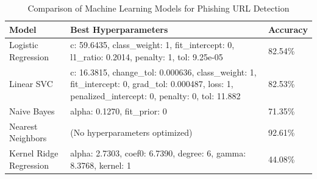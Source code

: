 \documentclass{article}
\begin{document}
    \begin{table}[H]
        \centering
        \begin{tabular}{|l|p{8cm}|l|}
            \hline
            \textbf{Model}          & \textbf{Best Hyperparameters}                                                                                                                          & \textbf{Accuracy} \\ \hline
            Logistic Regression     & c: 59.6435, class\_weight: 1, fit\_intercept: 0, l1\_ratio: 0.2014, penalty: 1, tol: 9.25e-05 & 82.54\% \\ \hline
            Linear SVC              & c: 16.3815, change\_tol: 0.000636, class\_weight: 1, fit\_intercept: 0, grad\_tol: 0.000487, loss: 1, penalized\_intercept: 0, penalty: 0, tol: 11.882 & 82.53\% \\ \hline
            Naive Bayes             & alpha: 0.1270, fit\_prior: 0                                                                                                                           & 71.35\%           \\ \hline
            Nearest Neighbors       & (No hyperparameters optimized)                                                                                                                         & 92.61\%           \\ \hline %
            Kernel Ridge Regression & alpha: 2.7303, coef0: 6.7390, degree: 6, gamma: 8.3768, kernel: 1 & 44.08\% \\ \hline
        \end{tabular}
        \caption{Comparison of Machine Learning Models for Phishing URL Detection}
        \label{tab:model_comparison}
    \end{table}

\end{document}
